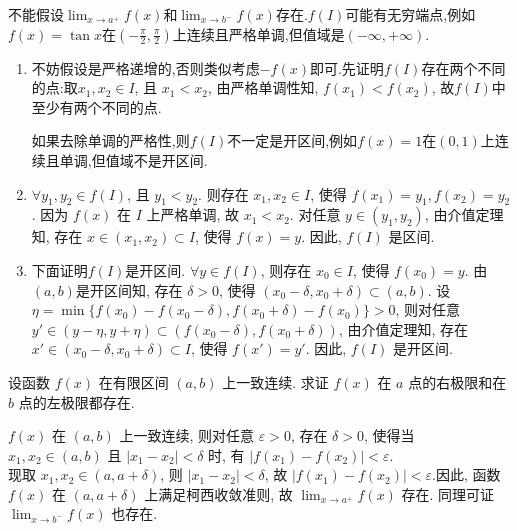 \begin{solution}
    \begin{remark}
        不能假设$\lim_{x \to a^+} f(x)$和$\lim_{x \to b^-} f(x)$存在.$f(I)$可能有无穷端点,例如$f(x)=\tan x$在$(-\frac{\pi}{2}, \frac{\pi}{2})$上连续且严格单调,但值域是$(-\infty,+\infty)$.
    \end{remark}
    \begin{enumerate}
        \item 不妨假设是严格递增的,否则类似考虑$-f(x)$即可.先证明$f(I)$存在两个不同的点:取$x_1, x_2 \in I$, 且 $x_1 < x_2$, 由严格单调性知, $f(x_1) < f(x_2)$, 故$f(I)$中至少有两个不同的点.
    
    \begin{remark}
        如果去除单调的严格性,则$f(I)$不一定是开区间,例如$f(x)=1$在$(0,1)$上连续且单调,但值域不是开区间.
    \end{remark}
        \item $\forall y_1, y_2 \in f(I)$, 且 $y_1 < y_2$. 则存在 $x_1, x_2 \in I$, 使得 $f(x_1) = y_1, f(x_2) = y_2$. 因为 $f(x)$ 在 $I$ 上严格单调, 故 $x_1 < x_2$. 对任意 $y \in (y_1, y_2)$, 由介值定理知, 存在 $x \in (x_1, x_2) \subset I$, 使得 $f(x) = y$. 因此, $f(I)$ 是区间.
        \item 下面证明$f(I)$是开区间. $\forall y \in f(I)$, 则存在 $x_0 \in I$, 使得 $f(x_0) = y$. 由$(a,b)$是开区间知, 存在 $\delta > 0$, 使得 $(x_0 - \delta, x_0 + \delta) \subset (a,b)$. 设 $\eta = \min\{f(x_0) - f(x_0 - \delta), f(x_0 + \delta) - f(x_0)\} > 0$, 则对任意 $y' \in (y - \eta, y + \eta)\subset (f(x_0 - \delta), f(x_0 + \delta))$, 由介值定理知, 存在 $x' \in (x_0 - \delta, x_0 + \delta) \subset I$, 使得 $f(x') = y'$. 因此, $f(I)$ 是开区间.
    \end{enumerate}
\end{solution}

\begin{exercise}[2.2.13]
    设函数 $f(x)$ 在有限区间 $(a,b)$ 上一致连续. 求证 $f(x)$ 在 $a$ 点的右极限和在 $b$ 点的左极限都存在.
\end{exercise}

\begin{solution}
    $f(x)$ 在 $(a,b)$ 上一致连续, 则对任意 $\varepsilon > 0$, 存在 $\delta > 0$, 使得当 $x_1, x_2 \in (a,b)$ 且 $|x_1 - x_2| < \delta$ 时, 有 $|f(x_1) - f(x_2)| < \varepsilon$. \\
    现取 $x_1, x_2 \in (a, a+\delta)$, 则 $|x_1 - x_2| < \delta$, 故 $|f(x_1) - f(x_2)| < \varepsilon$.因此, 函数 $f(x)$ 在 $(a, a+\delta)$ 上满足柯西收敛准则, 故 $\lim_{x \to a^+} f(x)$ 存在. 同理可证 $\lim_{x \to b^-} f(x)$ 也存在.
\end{solution}

